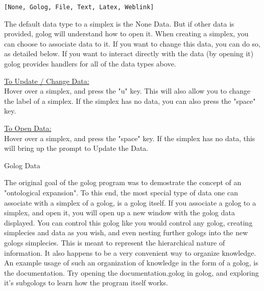 \documentclass{article}
\begin{document}
\begin{lstlisting}
[None, Golog, File, Text, Latex, Weblink]
\end{lstlisting}

The default data type to a simplex is the None Data. But if other data is provided, golog will understand how to open it. When creating a simplex, you can choose to associate data to it. If you want to change this data, you can do so, as detailed below. If you want to interact directly with the data (by opening it) golog provides handlers for all of the data types above.

\underline{To Update / Change Data: }\\
Hover over a simplex, and press the "u" key. This will also allow you to change the label of a simplex. If the simplex has no data, you can also press the "space" key.

\underline{To Open Data: }\\
Hover over a simplex, and press the "space" key. If the simplex has no data, this will bring up the prompt to Update the Data.\\


\begin{subsection}{Golog Data}
\end{subsection}

The original goal of the golog program was to demostrate the concept of an "ontological expansion". To this end, the most special type of data one can associate with a simplex of a golog, is a golog itself. If you associate a golog to a simplex, and open it, you will open up a new window with the golog data displayed. You can control this golog like you would control any golog, creating simplecies and data as you wish, and even nesting further gologs into the new gologs simplecies. This is meant to represent the hierarchical nature of information. It also happens to be a very convenient way to organize knowledge.\\

An example usage of such an organization of knowledge in the form of a golog, is the documentation. Try opening the documentation.golog in golog, and exploring it's subgologs to learn how the program itself works.
\end{document}

